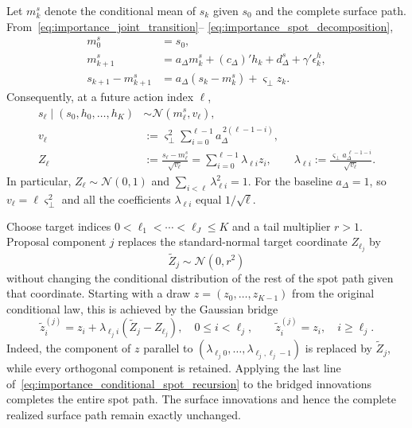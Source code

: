 \documentclass[11pt,a4paper]{article}
\begin{document}
Let $m_k^s$ denote the conditional mean of $s_k$ given $s_0$ and the complete
surface path. From~\eqref{eq:importance_joint_transition}--
\eqref{eq:importance_spot_decomposition},
\begin{equation}\label{eq:importance_conditional_spot_recursion}
\begin{split}
    m_0^s&=s_0,\\
    m_{k+1}^s
        &=a_\Delta m_k^s+(c_\Delta)'h_k+d_\Delta^s
          +\gamma'\epsilon_k^h,\\
    s_{k+1}-m_{k+1}^s
        &=a_\Delta(s_k-m_k^s)+\varsigma_\perp z_k.
\end{split}
\end{equation}
Consequently, at a future action index $\ell$,
\begin{equation}\label{eq:importance_target_spot}
\begin{split}
    s_\ell\mid(s_0,h_0,\ldots,h_K)
        &\sim\mathcal N(m_\ell^s,v_\ell),\\
    v_\ell
        &:=\varsigma_\perp^2
          \sum_{i=0}^{\ell-1}a_\Delta^{\,2(\ell-1-i)},\\
    Z_\ell
        &:=\frac{s_\ell-m_\ell^s}{\sqrt{v_\ell}}
          =\sum_{i=0}^{\ell-1}\lambda_{\ell i}z_i,
    \qquad
    \lambda_{\ell i}
        :=\frac{\varsigma_\perp
                 a_\Delta^{\,\ell-1-i}}{\sqrt{v_\ell}}.
\end{split}
\end{equation}
In particular, $Z_\ell\sim\mathcal N(0,1)$ and
$\sum_{i<\ell}\lambda_{\ell i}^2=1$. For the baseline $a_\Delta=1$, so
$v_\ell=\ell\varsigma_\perp^2$ and all the coefficients
$\lambda_{\ell i}$ equal $1/\sqrt{\ell}$.

Choose target indices $0<\ell_1<\cdots<\ell_J\leq K$ and a tail multiplier
$r>1$. Proposal component $j$ replaces the standard-normal target coordinate
$Z_{\ell_j}$ by
\[
    \widetilde Z_j\sim\mathcal N(0,r^2)
\]
without changing the conditional distribution of the rest of the spot path
given that coordinate. Starting with a draw $z=(z_0,\ldots,z_{K-1})$ from the
original conditional law, this is achieved by the Gaussian bridge
\begin{equation}\label{eq:importance_bridge}
    \widetilde z_i^{(j)}
    =z_i+\lambda_{\ell_j i}
        (\widetilde Z_j-Z_{\ell_j}),
    \quad 0\leq i<\ell_j,
    \qquad
    \widetilde z_i^{(j)}=z_i,
    \quad i\geq\ell_j.
\end{equation}
Indeed, the component of $z$ parallel to
$(\lambda_{\ell_j0},\ldots,\lambda_{\ell_j,\ell_j-1})$ is replaced by
$\widetilde Z_j$, while every orthogonal component is retained. Applying the
last line of~\eqref{eq:importance_conditional_spot_recursion} to the bridged
innovations completes the entire spot path. The surface innovations and hence
the complete realized surface path remain exactly unchanged.
\end{document}
